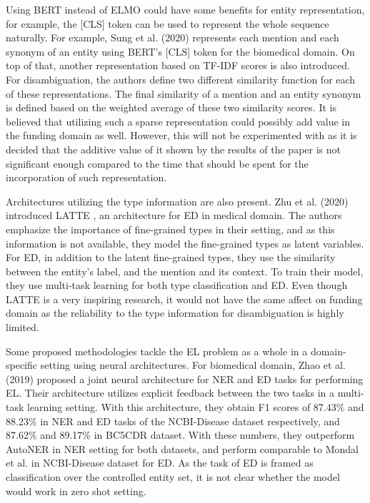 \documentclass{report}
\theoremstyle{definition}
\theoremstyle{remark}
\begin{document}
Using BERT instead of ELMO could have some benefits for entity representation, for example, the [CLS] token can be used to represent the whole sequence naturally. For example, Sung et al. (2020) \cite{sung-etal} represents each mention and each synonym of an entity using BERT's [CLS] token for the biomedical domain. On top of that, another representation based on TF-IDF scores is also introduced. For disambiguation, the authors define two different similarity function for each of these representations. The final similarity of a mention and an entity synonym is defined based on the weighted average of these two similarity scores. It is believed that utilizing such a sparse representation could possibly add value in the funding domain as well. However, this will not be experimented with as it is decided that the additive value of it shown by the results of the paper is not significant enough compared to the time that should be spent for the incorporation of such representation. 

Architectures utilizing the type information are also present. Zhu et al. (2020) introduced LATTE \cite{latte}, an architecture for ED in medical domain. The authors emphasize the importance of fine-grained types in their setting, and as this information is not available, they model the fine-grained types as latent variables. For ED, in addition to the latent fine-grained types, they use the similarity between the entity's label, and the mention and its context. To train their model, they use multi-task learning for both type classification and ED. Even though LATTE is a very inspiring research, it would not have the same affect on funding domain as the reliability to the type information for disambiguation is highly limited.

Some proposed methodologies tackle the EL problem as a whole in a domain-specific setting using neural architectures. For biomedical domain, Zhao et al. (2019) \cite{MedFeedback} proposed a joint neural architecture for NER and ED tasks for performing EL. Their architecture utilizes explicit feedback between the two tasks in a multi-task learning setting. With this architecture, they obtain F1 scores of 87.43\% and 88.23\% in NER and ED tasks of the NCBI-Disease dataset respectively, and 87.62\% and 89.17\% in BC5CDR dataset. With these numbers, they outperform AutoNER in NER setting for both datasets, and perform comparable to Mondal et al. \cite{MedicalTriplet} in NCBI-Disease dataset for ED. As the task of ED is framed as classification over the controlled entity set, it is not clear whether the model would work in zero shot setting.
\end{document}
